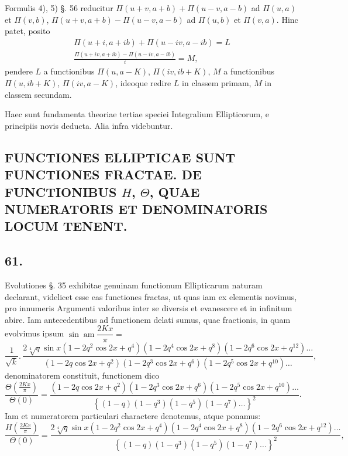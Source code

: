 \documentclass{article}
\begin{document}
Formulis 4), 5) §. 56 reducitur $\Pi(u+v,a+b)+\Pi(u-v,a-b)$ ad $\Pi(u,a)$ et $\Pi(v,b)$, $\Pi(u+v,a+b)-\Pi(u-v,a-b)$ ad $\Pi(u,b)$ et $\Pi(v,a)$. Hinc patet, posito
\[
\begin{gathered}
\Pi(u+i,a+ib)+\Pi(u-iv,a-ib)=L\\[1.5ex]
\frac{\Pi(u+iv,a+ib)-\Pi(u-iv,a-ib)}{i}=M,
\end{gathered}
\]
pendere $L$ a functionibus $\Pi(u,a-K)$, $\Pi(iv,ib+K)$, $M$ a functionibus $\Pi(u,ib+K)$, $\Pi(iv,a-K)$, ideoque redire $L$ in classem primam, $M$ in classem secundam.

Haec sunt fundamenta theoriae tertiae speciei Integralium Ellipticorum, e principiis novis deducta. Alia infra videbuntur.

\subsection*{FUNCTIONES ELLIPTICAE SUNT FUNCTIONES FRACTAE. DE FUNCTIONIBUS $H$, $\Theta$, QUAE NUMERATORIS ET DENOMINATORIS LOCUM TENENT.}

\subsection*{61.}

Evolutiones §. 35 exhibitae genuinam functionum Ellipticarum naturam declarant, videlicet esse eas functiones fractas, ut quas iam ex elementis novimus, pro innumeris Argumenti valoribus inter se diversis et evanescere et in infinitum abire. Iam antecedentibus ad functionem delati sumus, quae fractionis, in quam evolvimus ipsum $\sin\operatorname{am}\dfrac{2Kx}{\pi}=$
\[
\frac{1}{\sqrt{k}}.\,\frac{2\sqrt[4]{q}\sin x(1-2q^{2}\cos 2x+q^{4})(1-2q^{4}\cos 2x+q^{8})(1-2q^{6}\cos 2x+q^{12})\ldots}{(1-2q\cos 2x+q^{2})(1-2q^{3}\cos 2x+q^{6})(1-2q^{5}\cos 2x+q^{10})\ldots},
\]
denominatorem constituit, functionem dico
\[
\frac{\Theta\left(\frac{2Kx}{\pi}\right)}{\Theta(0)}=\frac{(1-2q\cos 2x+q^{2})(1-2q^{3}\cos 2x+q^{6})(1-2q^{5}\cos 2x+q^{10})\ldots}{\left\{(1-q)(1-q^{3})(1-q^{5})(1-q^{7})\ldots\right\}^{2}}.
\]
Iam et numeratorem particulari charactere denotemus, atque ponamus:
\[
\frac{H\left(\frac{2Kx}{\pi}\right)}{\Theta(0)}=\frac{2\sqrt[4]{q}\sin x(1-2q^{2}\cos 2x+q^{4})(1-2q^{4}\cos 2x+q^{8})(1-2q^{6}\cos 2x+q^{12})\ldots}{\left\{(1-q)(1-q^{3})(1-q^{5})(1-q^{7})\ldots\right\}^{2}},
\]
\end{document}
